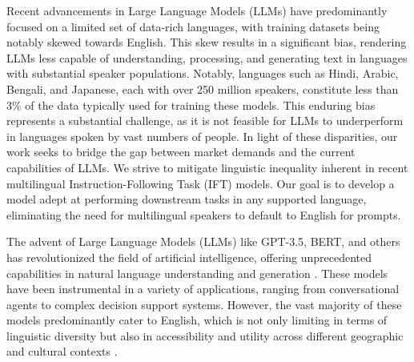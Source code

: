 \documentclass{article}
\begin{document}
Recent advancements in Large Language Models (LLMs) have predominantly focused on a limited set of data-rich languages, with training datasets being notably skewed towards English.
This skew results in a significant bias, rendering LLMs less capable of understanding, processing, and generating text in languages with substantial speaker populations.
Notably, languages such as Hindi, Arabic, Bengali, and Japanese, each with over 250 million speakers, constitute less than 3\% of the data typically used for training these models.
This enduring bias represents a substantial challenge, as it is not feasible for LLMs to underperform in languages spoken by vast numbers of people.
In light of these disparities, our work seeks to bridge the gap between market demands and the current capabilities of LLMs.
We strive to mitigate linguistic inequality inherent in recent multilingual Instruction-Following Task (IFT) models.
Our goal is to develop a model adept at performing downstream tasks in any supported language, eliminating the need for multilingual speakers to default to English for prompts. 

The advent of Large Language Models (LLMs) like GPT-3.5, BERT, and others has revolutionized the field of artificial intelligence, offering unprecedented capabilities in natural language understanding and generation \citep{brown2020language, devlin2018bert}.
These models have been instrumental in a variety of applications, ranging from conversational agents to complex decision support systems.
However, the vast majority of these models predominantly cater to English, which is not only limiting in terms of linguistic diversity but also in accessibility and utility across different geographic and cultural contexts \citep{jia2019bias}.
\end{document}
